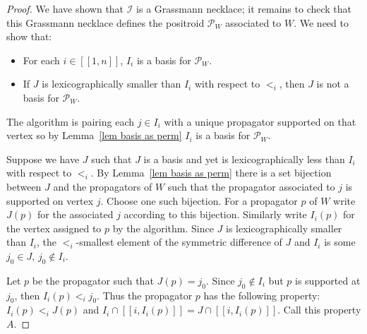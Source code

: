 \documentclass[11pt]{article}
\newcommand{\II}{\mathcal{I}}
\newcommand{\PP}{\mathcal{P}}
\newcommand{\interval}[2]{[\![#1,#2]\!]}
\theoremstyle{remark}
\theoremstyle{definition}
\begin{document}
\begin{proof}
\medskip 

We have shown that $\II$ is a Grassmann necklace; it remains to check that this Grassmann necklace defines the positroid $\PP_W$ associated to $W$.  We need to show that:
\begin{itemize}
\item For each $i \in \interval{1}{n}$, $I_i$ is a basis for $\PP_W$.
\item If $J$ is lexicographically smaller than $I_i$ with respect to $<_i$, then $J$ is not a basis for $\PP_W$.
\end{itemize}
The algorithm is pairing each $j \in I_i$ with a unique propagator supported on that vertex so by Lemma~\ref{lem basis as perm} $I_i$ is a basis for $\PP_W$.


Suppose we have $J$ such that $J$ is a basis and yet is lexicographically less than $I_i$ with respect to $<_i$.  By Lemma~\ref{lem basis as perm} there is a set bijection between $J$ and the propagators of $W$ such that the propagator associated to $j$ is supported on vertex $j$.  Choose one such bijection.  For a propagator $p$ of $W$ write $J(p)$ for the associated $j$ according to this bijection.  Similarly write $I_i(p)$ for the vertex assigned to $p$ by the algorithm.  Since $J$ is lexicographically smaller than $I_i$, the $<_i$-smallest element of the symmetric difference of $J$ and $I_i$ is some $j_0\in J$, $j_0 \not\in I_i$.

Let $p$ be the propagator such that $J(p)=j_0$.  Since $j_0\not\in I_i$ but $p$ is supported at $j_0$, then $I_i(p) <_i j_0$.  Thus the propagator $p$ has the following property: $I_i(p) <_i J(p)$ and $I_i\cap \interval{i}{I_i(p)} = J\cap \interval{i}{I_i(p)}$.  Call this property $A$.


\end{proof}
\end{document}
